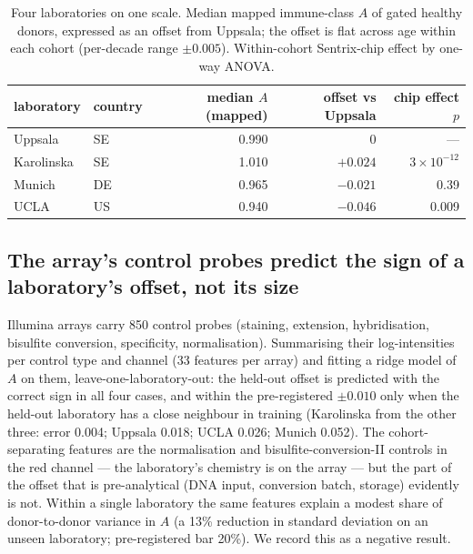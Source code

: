 \documentclass[12pt,a4paper]{article}
\begin{document}
\begin{table}[H]
\centering\small
\caption{Four laboratories on one scale. Median mapped immune-class $A$ of gated healthy donors, expressed as an offset from Uppsala; the offset is flat across age within each cohort (per-decade range $\pm 0.005$). Within-cohort Sentrix-chip effect by one-way ANOVA.}
\label{tab:labs}
\begin{tabular}{llrrr}
\toprule
laboratory & country & median $A$ (mapped) & offset vs Uppsala & chip effect $p$\\
\midrule
Uppsala & SE & 0.990 & 0 & ---\\
Karolinska & SE & 1.010 & $+0.024$ & $3\times10^{-12}$\\
Munich & DE & 0.965 & $-0.021$ & 0.39\\
UCLA & US & 0.940 & $-0.046$ & 0.009\\
\bottomrule
\end{tabular}
\end{table}

\subsection{The array's control probes predict the sign of a laboratory's offset, not its size}
Illumina arrays carry 850 control probes (staining, extension, hybridisation, bisulfite conversion, specificity, normalisation). Summarising their log-intensities per control type and channel (33 features per array) and fitting a ridge model of $A$ on them, leave-one-laboratory-out: the held-out offset is predicted with the correct sign in all four cases, and within the pre-registered $\pm 0.010$ only when the held-out laboratory has a close neighbour in training (Karolinska from the other three: error 0.004; Uppsala 0.018; UCLA 0.026; Munich 0.052). The cohort-separating features are the normalisation and bisulfite-conversion-II controls in the red channel --- the laboratory's chemistry is on the array --- but the part of the offset that is pre-analytical (DNA input, conversion batch, storage) evidently is not. Within a single laboratory the same features explain a modest share of donor-to-donor variance in $A$ (a 13\% reduction in standard deviation on an unseen laboratory; pre-registered bar 20\%). We record this as a negative result.
\end{document}

